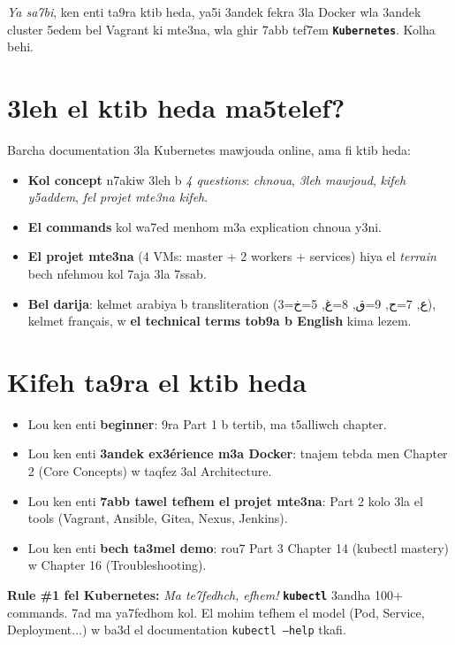 \documentclass[11pt,a4paper]{book}
\newcommand{\tuni}[1]{\textit{\color{k8sdark}#1}}
\newcommand{\tech}[1]{\texttt{\color{k8sblue}\textbf{#1}}}
\begin{document}
\tuni{Ya sa7bi}, ken enti ta9ra ktib heda, ya5i 3andek fekra 3la Docker wla 3andek cluster 5edem bel Vagrant ki mte3na, wla ghir 7abb tef7em \tech{Kubernetes}. Kolha behi.

\section*{3leh el ktib heda ma5telef?}

Barcha documentation 3la Kubernetes mawjouda online, ama fi ktib heda:
\begin{itemize}
  \item \textbf{Kol concept} n7akiw 3leh b \tuni{4 questions}: \emph{chnoua}, \emph{3leh mawjoud}, \emph{kifeh y5addem}, \emph{fel projet mte3na kifeh}.
  \item \textbf{El commands} kol wa7ed menhom m3a explication chnoua y3ni.
  \item \textbf{El projet mte3na} (4 VMs: master + 2 workers + services) hiya el \tuni{terrain} bech nfehmou kol 7aja 3la 7ssab.
  \item \textbf{Bel darija}: kelmet arabiya b transliteration (3=ع, 7=ح, 9=ق, 8=غ, 5=خ), kelmet français, w \textbf{el technical terms tob9a b English} kima lezem.
\end{itemize}

\section*{Kifeh ta9ra el ktib heda}

\begin{itemize}
  \item Lou ken enti \textbf{beginner}: 9ra Part 1 b tertib, ma t5alliwch chapter.
  \item Lou ken enti \textbf{3andek ex3érience m3a Docker}: tnajem tebda men Chapter 2 (Core Concepts) w taqfez 3al Architecture.
  \item Lou ken enti \textbf{7abb tawel tefhem el projet mte3na}: Part 2 kolo 3la el tools (Vagrant, Ansible, Gitea, Nexus, Jenkins).
  \item Lou ken enti \textbf{bech ta3mel demo}: rou7 Part 3 Chapter 14 (kubectl mastery) w Chapter 16 (Troubleshooting).
\end{itemize}

\begin{notebox}
\textbf{Rule \#1 fel Kubernetes:} \tuni{Ma te7fedhch, efhem!} \tech{kubectl} 3andha 100+ commands. 7ad ma ya7fedhom kol. El mohim tefhem el model (Pod, Service, Deployment...) w ba3d el documentation \texttt{kubectl --help} tkafi.
\end{notebox}
\end{document}

